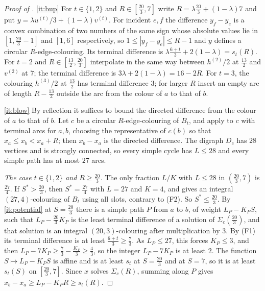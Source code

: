 \documentclass[11pt,colorlinks]{charlie}
\begin{document}
\begin{proof}[Proof of ]
\ref{it:bup} For $t\in\{1,2\}$ and $R\in[\frac{20}{3},7]$ write $R=\lambda\frac{20}{3}+(1-\lambda)7$ and put $y=\lambda u^{(t)}/3+(1-\lambda)v^{(t)}$. For incident $e,f$ the difference $y_f-y_e$ is a convex combination of two numbers of the same sign whose absolute values lie in $[1,\frac{20}3-1]$ and $[1,6]$ respectively, so $1\le|y_f-y_e|\le R-1$ and $y$ defines a circular $R$-edge-colouring. Its terminal difference is $\lambda\frac{6+t}{3}+2(1-\lambda)=s_t(R)$. For $t=2$ and $R\in[\frac{13}{2},\frac{20}{3}]$ interpolate in the same way between $h^{(2)}/2$ at $\frac{13}{2}$ and $v^{(2)}$ at $7$; the terminal difference is $3\lambda+2(1-\lambda)=16-2R$. For $t=3$, the colouring $h^{(3)}/2$ at $\frac{13}{2}$ has terminal difference $3$; for larger $R$ insert an empty arc of length $R-\frac{13}{2}$ outside the arc from the colour of $a$ to that of $b$.

\ref{it:blow} By reflection it suffices to bound the directed difference from the colour of $a$ to that of $b$. Let $c$ be a circular $R$-edge-colouring of $B_t$, and apply  to $c$ with terminal arcs for $a,b$, choosing the representative of $c(b)$ so that $x_a\le x_b<x_a+R$; then $x_b-x_a$ is the directed difference. The digraph $D_c$ has $28$ vertices and is strongly connected, so every simple cycle has $L\le28$ and every simple path has at most $27$ arcs.

\emph{The case $t\in\{1,2\}$ and $R\ge\frac{20}{3}$.} The only fraction $L/K$ with $L\le28$ in $(\frac{20}{3},7)$ is $\frac{27}{4}$. If $S^*>\frac{20}{3}$, then $S^*=\frac{27}{4}$ with $L=27$ and $K=4$, and  gives an integral $(27,4)$-colouring of $B_t$ using all slots, contrary to (F2). So $S^*\le\frac{20}{3}$. By \ref{it:potential} at $S=\frac{20}{3}$ there is a simple path $P$ from $a$ to $b$, of weight $L_P-K_PS$, such that $L_P-\frac{20}{3}K_P$ is the least terminal difference of a solution of $\Sigma_c(\frac{20}{3})$, and that solution is an integral $(20,3)$-colouring after multiplication by $3$. By (F1) its terminal difference is at least $\frac{6+t}{3}\ge\frac73$. As $L_P\le27$, this forces $K_P\le3$, and then $L_P-7K_P\ge\frac73-\frac{K_P}3\ge\frac43$, so the integer $L_P-7K_P$ is at least $2$. The function $S\mapsto L_P-K_PS$ is affine and is at least $s_t$ at $S=\frac{20}{3}$ and at $S=7$, so it is at least $s_t(S)$ on $[\frac{20}{3},7]$. Since $x$ solves $\Sigma_c(R)$, summing along $P$ gives $x_b-x_a\ge L_P-K_PR\ge s_t(R)$.


\end{proof}
\end{document}
